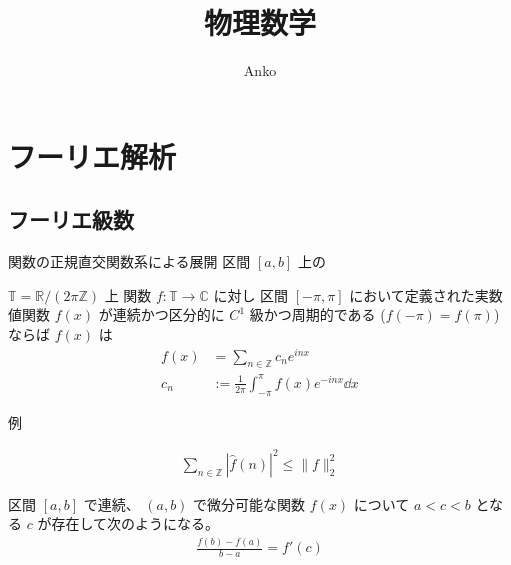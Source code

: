 \documentclass[uplatex,dvipdfmx,a4paper,11pt]{jlreq}
\title{物理数学}
\author{Anko}
\newcommand{\CC}{\mathbb{C}}
\newcommand{\RR}{\mathbb{R}}
\newcommand{\ZZ}{\mathbb{Z}}
\newcommand{\TT}{\mathbb{T}}
\theoremstyle{definition}
\begin{document}
\maketitle

\section{フーリエ解析}
\subsection{フーリエ級数}
\begin{definition}[内積]
  関数の正規直交関数系による展開
  区間 $[a, b]$ 上の
\end{definition}


\begin{definition}[複素フーリエ級数]
  $\TT = \RR/(2\pi\ZZ)$ 上 関数 $f: \TT\to\CC$ に対し
  区間 $[-\pi, \pi]$ において定義された実数値関数 $f(x)$ が連続かつ区分的に $C^1$ 級かつ周期的である ($f(-\pi) = f(\pi)$) ならば $f(x)$ は
  \begin{align}
    f(x) & = \sum_{n\in\ZZ}c_ne^{inx}                          \\
    c_n  & := \frac{1}{2\pi}\int_{-\pi}^\pi f(x)e^{-inx}\dd{x}
  \end{align}
\end{definition}
例
\begin{theorem}
  \begin{align}
    \sum_{n\in\ZZ}|\hat{f}(n)|^2 \leq \|f\|_2^2
  \end{align}
\end{theorem}


\begin{theorem}[平均値の定理]
  区間 $[a, b]$ で連続、 $(a, b)$ で微分可能な関数 $f(x)$ について $a < c < b$ となる $c$ が存在して次のようになる。
  \begin{align}
    \frac{f(b) - f(a)}{b - a} = f'(c)
  \end{align}
\end{theorem}
\end{document}
